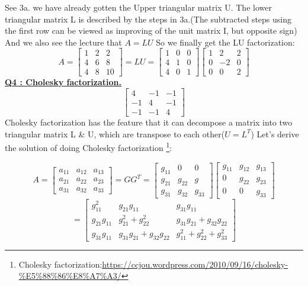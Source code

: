 \documentclass{article}
\begin{document}
See 3a. we have already gotten the Upper triangular matrix U. The lower triangular matrix L is described by the steps in 3a.(The subtracted steps using the first row can be viewed as improving of the unit matrix I, but opposite sign)
And we also see the lecture that $A=LU$
So we finally get the LU factorization:
\[
A=
{\begin{bmatrix}
1 & 2 & 2\\
4 & 6 & 8\\
4 & 8 & 10
\end{bmatrix}}
=LU
=
{\begin{bmatrix}
1 & 0 & 0\\
4 & 1 & 0\\
4 & 0 & 1
\end{bmatrix}}
{\begin{bmatrix}
1 & 2 & 2\\
0 &-2 & 0\\
0 & 0 & 2
\end{bmatrix}}
\]
\underline{\textbf{Q4 : Cholesky factorization.}}\\
\[
{\begin{bmatrix}
4 &-1 &-1\\
-1& 4 &-1\\
-1&-1 & 4
\end{bmatrix}}
\]
Cholesky factorization has the feature that it can decompose a matrix into two triangular matrix L \& U, which are transpose to each other($U=L^T$)
Let's derive the solution of doing Cholesky factorization
\footnote{Cholesky factorization:\href{https://ccjou.wordpress.com/2010/09/16/cholesky-\%E5\%88\%86\%E8\%A7\%A3/}{https://ccjou.wordpress.com/2010/09/16/cholesky-\%E5\%88\%86\%E8\%A7\%A3/}}:


\[
A=
{\begin{bmatrix}
a_{11} & a_{12} & a_{13}\\
a_{21} & a_{22} & a_{23}\\
a_{31} & a_{32} & a_{33}
\end{bmatrix}}
=
GG^T
=
{\begin{bmatrix}
g_{11} & 0 & 0\\
g_{21} & g_{22} & g\\
g_{31} & g_{32} & g_{33}
\end{bmatrix}}
{\begin{bmatrix}
g_{11} & g_{12} & g_{13}\\
0 & g_{22} & g_{23}\\
0 & 0 & g_{33}
\end{bmatrix}}
\]
\[
=
{\begin{bmatrix}
g^2_{11} & g_{21}g_{11} & g_{31}g_{11}\\
g_{21}g_{11} & g^2_{21}+g^2_{22} & g_{31}g_{21}+g_{32}g_{22}\\
g_{31}g_{11} & g_{31}g_{21}+g_{32}g_{22} & g^2_{11}+g^2_{22}+g^2_{33}
\end{bmatrix}}
\]
\end{document}
